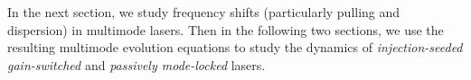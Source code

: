 
In the next section, we study frequency shifts (particularly pulling and dispersion) in multimode lasers. Then in the following two sections, we use the resulting multimode evolution equations to study the dynamics of \emph{injection-seeded gain-switched} and \emph{passively mode-locked} lasers.

